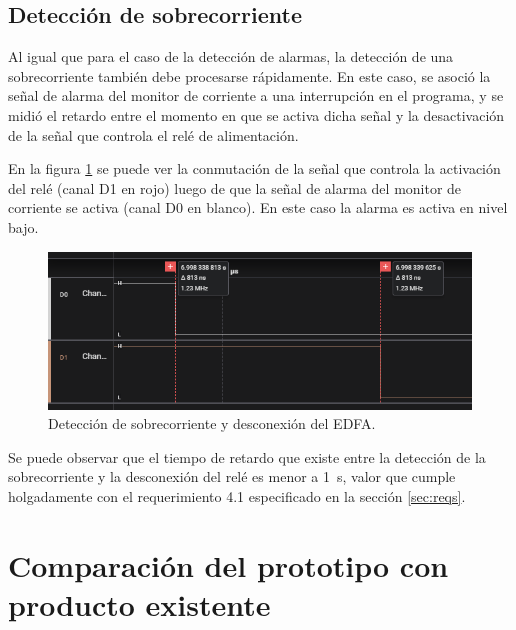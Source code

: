 \subsection{Detección de sobrecorriente}

Al igual que para el caso de la detección de alarmas, la detección de una sobrecorriente también debe procesarse rápidamente. En este caso, se asoció la señal de alarma del monitor de corriente a una interrupción en el programa, y se midió el retardo entre el momento en que se activa dicha señal y la desactivación de la señal que controla el relé de alimentación.

En la figura \ref{fig:detecOC} se puede ver la conmutación de la señal que controla la activación del relé (canal D1 en rojo) luego de que la señal de alarma del monitor de corriente se activa (canal D0 en blanco). En este caso la alarma es activa en nivel bajo.

\begin{figure}[H]
\centering
\includegraphics[width=1\textwidth]{./Figures/detecOC.png}
\caption{Detección de sobrecorriente y desconexión del EDFA.}
\label{fig:detecOC}
\end{figure}

Se puede observar que el tiempo de retardo que existe entre la detección de la sobrecorriente y la desconexión del relé es menor a 1~\textmu s, valor que cumple holgadamente con el requerimiento 4.1 especificado en la sección \ref{sec:reqs}.

\section{Comparación del prototipo con producto existente}

